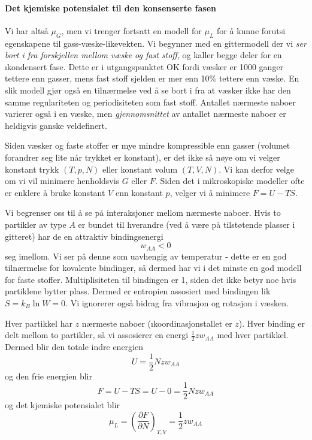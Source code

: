 \paragraph{Det kjemiske potensialet til den konsenserte fasen} Vi har altså $\mu_G$, men vi trenger fortsatt en modell for $\mu_L$ for å kunne forutsi egenskapene til gass-væske-likevekten. Vi begynner med en gittermodell der vi \emph{ser bort i fra forskjellen mellom væske og fast stoff}, og kaller begge deler for en \i{kondensert fase}. Dette er i utgangspunktet OK fordi væsker er 1000 ganger tettere enn gasser, mens fast stoff sjelden er mer enn 10\% tettere enn væske. En slik modell gjør også en tilnærmelse ved å se bort i fra at væsker ikke har den samme regulariteten og periodisiteten som fast stoff. Antallet nærmeste naboer varierer også i en væske, men \emph{gjennomsnittet} av antallet nærmeste naboer er heldigvis ganske veldefinert.

Siden væsker og faste stoffer er mye mindre kompressible enn gasser (volumet forandrer seg lite når trykket er konstant), er det ikke så nøye om vi velger konstant trykk $(T,p,N)$ eller konstant volum $(T,V,N)$. Vi kan derfor velge om vi vil minimere henholdsvis $G$ eller $F$. Siden det i mikroskopiske modeller ofte er enklere å bruke konstant $V$ enn konstant $p$, velger vi å minimere $F=U-TS$.

Vi begrenser oss til å se på interaksjoner mellom nærmeste naboer. Hvis to partikler av type $A$ er bundet til hverandre (ved å være på tilstøtende plasser i gitteret) har de en attraktiv bindingsenergi 
\begin{equation}
	w_{AA}<0
\end{equation}
seg imellom. Vi ser på denne som uavhengig av temperatur - dette er en god tilnærmelse for kovalente bindinger, så dermed har vi i det minste en god modell for faste stoffer. Multiplisiteten til bindingen er 1, siden det ikke betyr noe hvis partiklene bytter plass. Dermed er entropien assosiert med bindingen lik $S=k_B\ln W = 0$. Vi ignorerer også bidrag fra vibrasjon og rotasjon i væsken.

Hver partikkel har $z$ nærmeste naboer (\i{koordinasjonstallet} er $z$). Hver binding er delt mellom to partikler, så vi assosierer en energi $\frac{1}{2}zw_{AA}$ med hver partikkel. Dermed blir den totale indre energien 
\begin{equation}
	\label{bondingenergy}
	U = \frac{1}{2}Nzw_{AA}
\end{equation}
og den frie energien blir
\begin{equation}
	F = U - TS = U - 0 = \frac{1}{2}Nzw_{AA}
\end{equation}
og det kjemiske potensialet blir
\begin{equation}
	\mu_L = \left(\frac{\partial F}{\partial N}\right)_{T,V} = \frac{1}{2}zw_{AA}
\end{equation}

